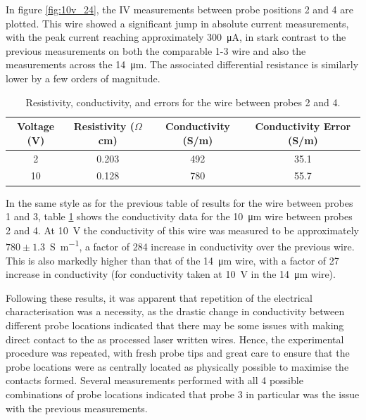\begin{refsection}
In figure \ref{fig:10v_24}, the IV measurements between probe positions 2 and 4 are plotted. This wire showed a significant jump in absolute current measurements, with the peak current reaching approximately $300$~\si{\micro\ampere}, in stark contrast to the previous measurements on both the comparable 1-3 wire and also the measurements across the 14~\si{\micro\metre}. The associated differential resistance is similarly lower by a few orders of magnitude.

\begin{table}[ht]
\centering
\begin{tabular}{|c|c|c|c|}
\hline
Voltage (V) & Resistivity ($\Omega$cm) & Conductivity (S/m) & Conductivity Error (S/m) \\
\hline
2 & 0.203 & 492 & 35.1 \\
10 & 0.128 & 780 & 55.7 \\
\hline
\end{tabular}
\caption{Resistivity, conductivity, and errors for the wire between probes 2 and 4.}
\label{table:24_resistivity_conductivity_updated}
\end{table}

In the same style as for the previous table of results for the wire between probes 1 and 3, table \ref{table:24_resistivity_conductivity_updated} shows the conductivity data for the 10~\si{\micro\metre} wire between probes 2 and 4. At 10~\si{\volt} the conductivity of this wire was measured to be approximately $780\pm1.3$~\si{\siemens\per\metre}, a factor of 284 increase in conductivity over the previous wire. This is also markedly higher than that of the 14~\si{\micro\metre} wire, with a factor of 27 increase in conductivity (for conductivity taken at 10~\si{\volt} in the 14~\si{\micro\metre} wire).

Following these results, it was apparent that repetition of the electrical characterisation was a necessity, as the drastic change in conductivity between different probe locations indicated that there may be some issues with making direct contact to the as processed laser written wires. Hence, the experimental procedure was repeated, with fresh probe tips and great care to ensure that the probe locations were as centrally located as physically possible to maximise the contacts formed. Several measurements performed with all 4 possible combinations of probe locations indicated that probe 3 in particular was the issue with the previous measurements.


\end{refsection}
